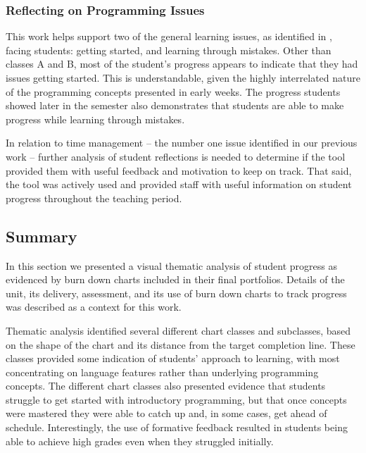 
\subsubsection{Reflecting on Programming Issues} %
\label{sub:relation_to_issues}

This work helps support two of the general learning issues, as identified in , facing students: getting started, and learning through mistakes. Other than classes A and B, most of the student's progress appears to indicate that they had issues getting started. This is understandable, given the highly interrelated nature of the programming concepts presented in early weeks. The progress students showed later in the semester also demonstrates that students are able to make progress while learning through mistakes. 

In relation to time management -- the number one issue identified in our previous work -- further analysis of student reflections is needed to determine if the tool provided them with useful feedback and motivation to keep on track. That said, the tool was actively used and provided staff with useful information on student progress throughout the teaching period.




\subsection{Summary} %
\label{sec:progress_summary}

In this section we presented a visual thematic analysis of student progress as evidenced by burn down charts included in their final portfolios. Details of the unit, its delivery, assessment, and its use of burn down charts to track progress was described as a context for this work.  

Thematic analysis identified several different chart classes and subclasses, based on the shape of the chart and its distance from the target completion line. These classes provided some indication of students' approach to learning, with most concentrating on language features rather than underlying programming concepts. The different chart classes also presented evidence that students struggle to get started with introductory programming, but that once concepts were mastered they were able to catch up and, in some cases, get ahead of schedule. Interestingly, the use of formative feedback resulted in students being able to achieve high grades even when they struggled initially.


